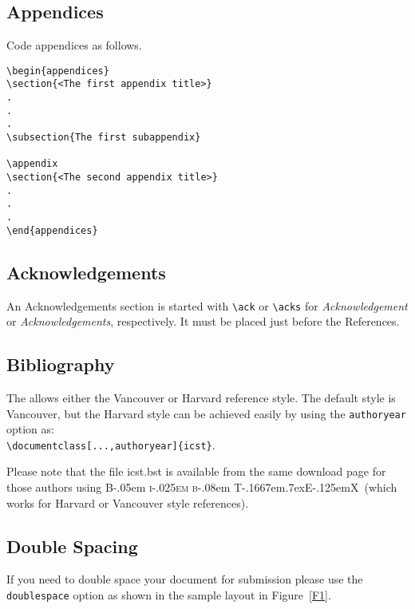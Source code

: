 \documentclass[fonts]{icst}
\newcommand\BibTeX{{\rmfamily B\kern-.05em \textsc{i\kern-.025em b}\kern-.08em
T\kern-.1667em\lower.7ex\hbox{E}\kern-.125emX}}
\begin{document}
\subsection{Appendices}
Code appendices as follows.
\begin{verbatim}
\begin{appendices}
\section{<The first appendix title>}
.
.
.
\subsection{The first subappendix}

\appendix
\section{<The second appendix title>}
.
.
.
\end{appendices}
\end{verbatim}


\subsection{Acknowledgements} An Acknowledgements section is started with \verb"\ack" or
\verb"\acks" for \textit{Acknowledgement} or
\textit{Acknowledgements}, respectively. It must be placed just
before the References.

\subsection{Bibliography}
The \emph{\journalnamelc} allows either the Vancouver or Harvard
reference style. The default style is Vancouver, but the Harvard
style can be achieved easily by using the \verb"authoryear"
option as:\\
\verb"\documentclass[...,authoryear]{icst}".

Please note that the file \textsf{icst.bst} is available from the
same download page for those authors using \BibTeX\ (which works
for Harvard or Vancouver style references).

\subsection{Double Spacing}
If you need to double space your document for submission please
use the \verb+doublespace+ option as shown in the sample layout in
Figure~\ref{F1}.
\end{document}
